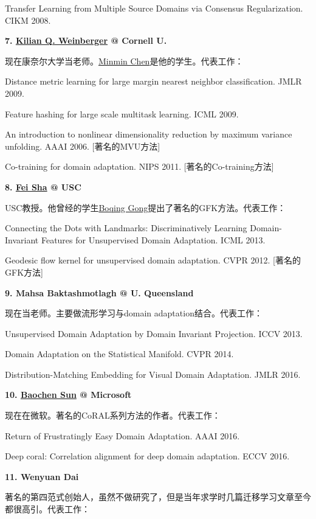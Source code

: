 Transfer Learning from Multiple Source Domains via Consensus Regularization. CIKM 2008.


\textbf{7. \href{https://www.cs.cornell.edu/~kilian/}{Kilian Q. Weinberger} @ Cornell U.}

现在康奈尔大学当老师。\href{http://www.cse.wustl.edu/~mchen/}{Minmin Chen}是他的学生。代表工作：

Distance metric learning for large margin nearest neighbor classification. JMLR 2009.

Feature hashing for large scale multitask learning. ICML 2009.

An introduction to nonlinear dimensionality reduction by maximum variance unfolding. AAAI 2006. [著名的MVU方法]

Co-training for domain adaptation. NIPS 2011. [著名的Co-training方法]

\textbf{8. \href{http://www.cse.wustl.edu/~mchen/}{Fei Sha} @ USC}

USC教授。他曾经的学生\href{http://www.cecs.ucf.edu/faculty/boqing-gong/}{Boqing Gong}提出了著名的GFK方法。代表工作：

Connecting the Dots with Landmarks: Discriminatively Learning Domain-Invariant Features for Unsupervised Domain Adaptation. ICML 2013.

Geodesic flow kernel for unsupervised domain adaptation. CVPR 2012. [著名的GFK方法]


\textbf{9. Mahsa Baktashmotlagh @ U. Queensland}

现在当老师。主要做流形学习与domain adaptation结合。代表工作：

Unsupervised Domain Adaptation by Domain Invariant Projection. ICCV 2013.

Domain Adaptation on the Statistical Manifold. CVPR 2014.

Distribution-Matching Embedding for Visual Domain Adaptation. JMLR 2016.


\textbf{10. \href{https://www.microsoft.com/en-us/research/people/baochens/}{Baochen Sun} @ Microsoft}

现在在微软。著名的CoRAL系列方法的作者。代表工作：

Return of Frustratingly Easy Domain Adaptation. AAAI 2016.

Deep coral: Correlation alignment for deep domain adaptation. ECCV 2016.


\textbf{11. Wenyuan Dai}

著名的第四范式创始人，虽然不做研究了，但是当年求学时几篇迁移学习文章至今都很高引。代表工作：


